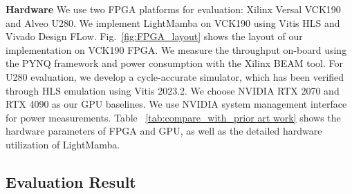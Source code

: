\textbf{Hardware}
We use two FPGA platforms for evaluation: Xilinx Versal VCK190 and Alveo U280. 
We implement LightMamba on VCK190 using Vitis HLS
and Vivado Design FLow.
Fig.~\ref{fig:FPGA_layout} shows the layout
of our implementation on VCK190 FPGA.
We measure the throughput on-board using the PYNQ framework
and power consumption with the Xilinx BEAM tool.
For U280 evaluation, we develop a cycle-accurate simulator, 
which has been verified through HLS emulation using Vitis 2023.2.
We choose NVIDIA RTX 2070 and RTX 4090 as our GPU baselines.
We use NVIDIA system management interface for power 
measurements. 
Table ~\ref{tab:compare_with_prior art work} shows the hardware parameters of FPGA and GPU, as well as the detailed hardware utilization of LightMamba.


\subsection{Evaluation Result}
\label{subsec:Evaluation result}


